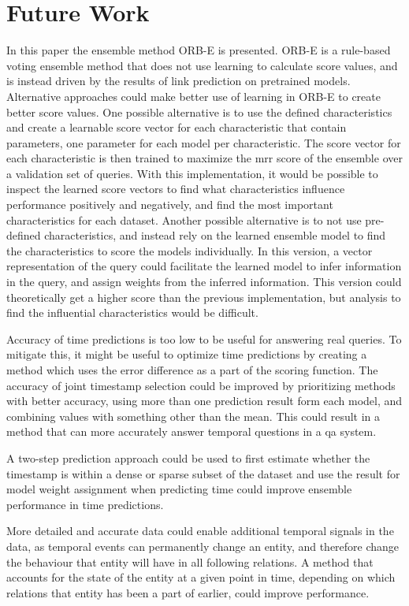 \section{Future Work}
\label{sec:future-work}

In this paper the ensemble method ORB-E is presented. ORB-E is a rule-based voting ensemble method that does not use learning to calculate score values, and is instead driven by the results of link prediction on pretrained models. Alternative approaches could make better use of learning in ORB-E to create better score values.
One possible alternative is to use the defined characteristics and create a learnable score vector for each characteristic that contain parameters, one parameter for each model per characteristic. The score vector for each characteristic is then trained to maximize the \gls{mrr} score of the ensemble over a validation set of queries. With this implementation, it would be possible to inspect the learned score vectors to find what characteristics influence performance positively and negatively, and find the most important characteristics for each dataset.
Another possible alternative is to not use pre-defined characteristics, and instead rely on the learned ensemble model to find the characteristics to score the models individually. In this version, a vector representation of the query could facilitate the learned model to infer information in the query, and assign weights from the inferred information. This version could theoretically get a higher score than the previous implementation, but analysis to find the influential characteristics would be difficult.

Accuracy of time predictions is too low to be useful for answering real queries.
To mitigate this, it might be useful to optimize time predictions by creating a method which uses the error difference as a part of the scoring function.
The accuracy of joint timestamp selection could be improved by prioritizing methods with better accuracy, using more than one prediction result form each model, and combining values with something other than the mean.
This could result in a method that can more accurately answer temporal questions in a \gls{qa} system.

A two-step prediction approach could be used to first estimate whether the timestamp is within a dense or sparse subset of the dataset and use the result for model weight assignment when predicting time could improve ensemble performance in time predictions.

More detailed and accurate data could enable additional temporal signals in the data, as temporal events can permanently change an entity, and therefore change the behaviour that entity will have in all following relations.
A method that accounts for the state of the entity at a given point in time, depending on which relations that entity has been a part of earlier, could improve performance.